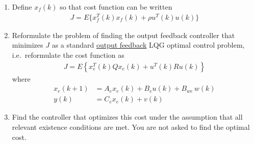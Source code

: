 \begin{enumerate}
    \item
    Define $x_f(k)$ so that cost function can be written
    \begin{align*}
        J = E \{ x_f^T(k) x_f(k) + \rho u^T(k) u(k) \}
    \end{align*}

    \item
    Reformulate the problem of finding the output feedback controller that minimizes $J$ as a standard \underline{output feedback} LQG optimal control problem, i.e.\ reformulate the cost function as
    \begin{align*}
        J = E \left\{ x_e^T(k) Q x_e(k) + u^T(k) R u(k) \right\}
    \end{align*}
    where
    \begin{align*}
        x_e(k+1) & = A_e x_e(k) + B_e u(k) + B_{we} \, w(k) \\
        y(k) & = C_e x_e(k) + v(k)
    \end{align*}

    \item
    Find the controller that optimizes this cost under the assumption that all relevant existence conditions are met. You are not asked to find the optimal cost.

\end{enumerate} 